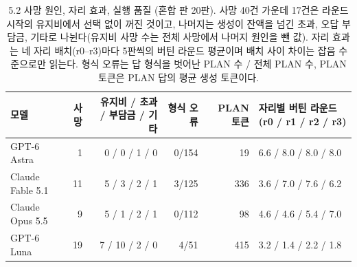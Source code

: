 \begin{table}[H]
\centering\scriptsize
\setlength{\tabcolsep}{3pt}
\caption{5.2 사망 원인, 자리 효과, 실행 품질 (혼합 판 20판). 사망 40건 가운데 17건은 라운드 시작의 유지비에서 선택 없이 꺼진 것이고, 나머지는 생성이 잔액을 넘긴 초과, 오답 부담금, 기타로 나뉜다(유지비 사망 수는 전체 사망에서 나머지 원인을 뺀 값). 자리 효과는 네 자리 배치(r0--r3)마다 5판씩의 버틴 라운드 평균이며 배치 사이 차이는 잡음 수준으로만 읽는다. 형식 오류는 답 형식을 벗어난 PLAN 수 / 전체 PLAN 수, PLAN 토큰은 PLAN 답의 평균 생성 토큰이다.}
\label{tab:arena-misc}
\begin{tabular}{@{}lrrrrl@{}}
\toprule
모델 & 사망 & 유지비 / 초과 / 부담금 / 기타 & 형식 오류 & PLAN 토큰 & 자리별 버틴 라운드 (r0 / r1 / r2 / r3) \\
\midrule
GPT-6 Astra & 1 & 0 / 0 / 1 / 0 & 0/154 & 19 & 6.6 / 8.0 / 8.0 / 8.0 \\
Claude Fable 5.1 & 11 & 5 / 3 / 2 / 1 & 3/125 & 336 & 3.6 / 7.0 / 7.6 / 6.2 \\
Claude Opus 5.5 & 9 & 5 / 1 / 2 / 1 & 0/112 & 98 & 4.6 / 4.6 / 5.4 / 7.0 \\
GPT-6 Luna & 19 & 7 / 10 / 2 / 0 & 4/51 & 415 & 3.2 / 1.4 / 2.2 / 1.8 \\
\bottomrule
\end{tabular}
\end{table}
